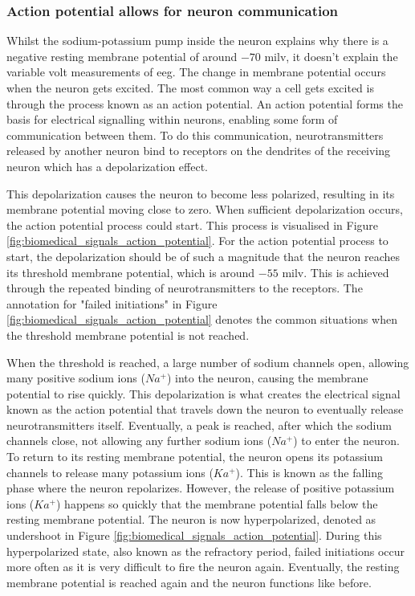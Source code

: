 
\subsubsection{Action potential allows for neuron communication}
\label{subsubsec:biomedical_signals_biosignals_electrical_action_potential}

Whilst the sodium-potassium pump inside the neuron explains why there is a negative resting membrane potential of around $-70$ \gls{milv}, it doesn't explain the variable volt measurements of \gls{eeg}.
The change in membrane potential occurs when the neuron gets excited.
The most common way a cell gets excited is through the process known as an action potential.
An action potential forms the basis for electrical signalling within neurons, enabling some form of communication between them.
To do this communication, neurotransmitters released by another neuron bind to receptors on the dendrites of the receiving neuron which has a depolarization effect.

This depolarization causes the neuron to become less polarized, resulting in its membrane potential moving close to zero.
When sufficient depolarization occurs, the action potential process could start.
This process is visualised in Figure \ref{fig:biomedical_signals_action_potential}.
For the action potential process to start, the depolarization should be of such a magnitude that the neuron reaches its threshold membrane potential, which is around $-55$ \gls{milv}.
This is achieved through the repeated binding of neurotransmitters to the receptors.
The annotation for "failed initiations" in Figure \ref{fig:biomedical_signals_action_potential} denotes the common situations when the threshold membrane potential is not reached.

When the threshold is reached, a large number of sodium channels open, allowing many positive sodium ions ($Na^+$) into the neuron, causing the membrane potential to rise quickly.
This depolarization is what creates the electrical signal known as the action potential that travels down the neuron to eventually release neurotransmitters itself.
Eventually, a peak is reached, after which the sodium channels close, not allowing any further sodium ions ($Na^+$) to enter the neuron.
To return to its resting membrane potential, the neuron opens its potassium channels to release many potassium ions ($Ka^+$).
This is known as the falling phase where the neuron repolarizes.
However, the release of positive potassium ions ($Ka^+$) happens so quickly that the membrane potential falls below the resting membrane potential.
The neuron is now hyperpolarized, denoted as undershoot in Figure \ref{fig:biomedical_signals_action_potential}.
During this hyperpolarized state, also known as the refractory period, failed initiations occur more often as it is very difficult to fire the neuron again.
Eventually, the resting membrane potential is reached again and the neuron functions like before.


